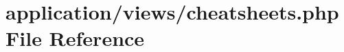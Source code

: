 \hypertarget{cheatsheets_8php}{\section{application/views/cheatsheets.php File Reference}
\label{cheatsheets_8php}
}
